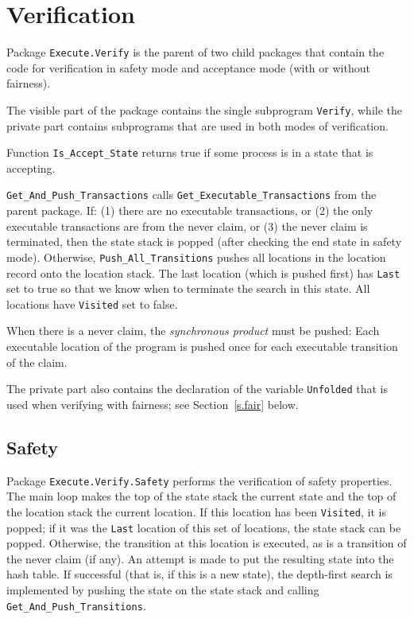\documentclass[11pt]{article}
\newcommand*{\p}[1]{\texttt{#1}}
\begin{document}
\section{Verification}\label{s.verif}
Package \p{Execute.Verify} is the parent of two child packages that
contain the code for verification in safety mode and acceptance mode
(with or without fairness).

The visible part of the package contains the single subprogram
\p{Verify}, while the private part contains subprograms that are used in
both modes of verification.

Function \p{Is\_Accept\_State} returns true if some process is in a
state that is accepting.

\p{Get\_And\_Push\_Transactions} calls \p{Get\_Executable\_Transactions}
from the parent package. If: (1) there are no executable transactions,
or (2) the only executable transactions are from the never claim, or (3)
the never claim is terminated, then the state stack is popped (after
checking the end state in safety mode). Otherwise,
\p{Push\_All\_Transitions} pushes all locations in the location record
onto the location stack. The last location (which is pushed first) has
\p{Last} set to true so that we know when to terminate the search in
this state. All locations have \p{Visited} set to false.

When there is a never claim, the \emph{synchronous product} must be
pushed: Each executable location of the program is pushed once for each
executable transition of the claim.

The private part also contains the declaration of the variable
\p{Unfolded} that is used when verifying with fairness; see
Section~\ref{s.fair} below.

\subsection{Safety}
Package \p{Execute.Verify.Safety} performs the verification of safety
properties. The main loop makes the top of the state stack the current
state and the top of the location stack the current location. If this
location has been \p{Visited}, it is popped; if it was the
\p{Last} location of this set of locations, the state stack can be
popped. Otherwise, the transition at this location is executed, as is a
transition of the never claim (if any). An attempt is made to put the
resulting state into the hash table. If successful (that is, if this is
a new state), the depth-first search is implemented by pushing the state
on the state stack and calling \p{Get\_And\_Push\_Transitions}.
\end{document}
